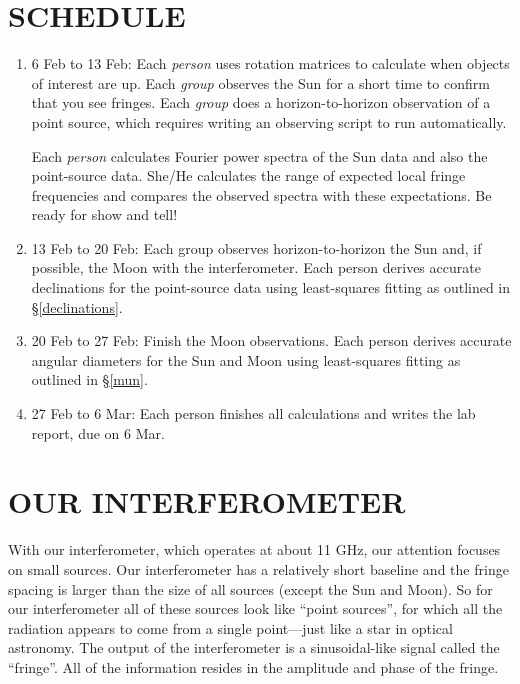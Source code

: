 \documentclass[11pt,preprint]{aastex}
\begin{document}
\section{SCHEDULE}

\begin{enumerate}

\item 6 Feb to 13 Feb: Each {\it person} uses rotation matrices to
calculate when objects of interest are up. Each {\it group} observes the
Sun for a short time to confirm that you see fringes. Each {\it group}
does a horizon-to-horizon observation of a point source, which requires
writing an observing script to run automatically.

Each {\it person} calculates Fourier power spectra of the Sun data and
also the point-source data. She/He calculates the range of expected
local fringe frequencies and compares the observed spectra with these
expectations. Be ready for show and tell!

\item 13 Feb to 20 Feb: Each group observes horizon-to-horizon the Sun
  and, if possible, the Moon with the interferometer.  Each person
  derives accurate declinations for the point-source data using
  least-squares fitting as outlined in \S \ref{declinations}.

\item 20 Feb to 27 Feb: Finish the Moon observations. Each person
  derives accurate angular diameters for the Sun and Moon using
  least-squares fitting as outlined in \S \ref{mun}. 

\item 27 Feb to 6 Mar: Each person finishes all calculations and
writes the lab report, due on 6 Mar.

\end{enumerate}

\section{OUR INTERFEROMETER}

	With our interferometer, which operates at about 11 GHz, our
attention focuses on small sources.  Our interferometer has a relatively
short baseline and the fringe spacing is larger than the size of all
sources (except the Sun and Moon).  So for our interferometer all of
these sources look like ``point sources'', for which all the radiation
appears to come from a single point---just like a star in optical
astronomy.  The output of the interferometer is a sinusoidal-like signal
called the ``fringe''. All of the information resides in the amplitude
and phase of the fringe.
\end{document}
